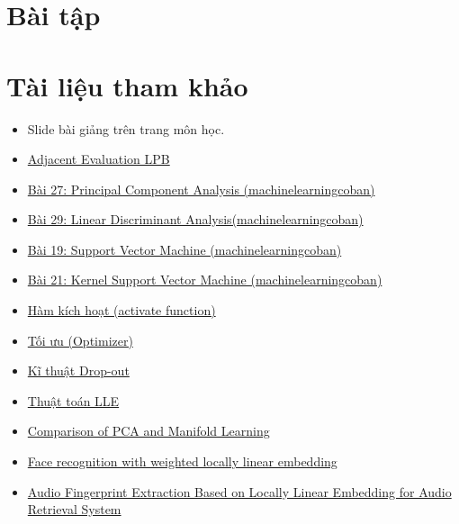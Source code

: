 \documentclass[a4paper, 12pt]{article}
\begin{document}
\section{Bài tập}



\pagebreak

\section{Tài liệu tham khảo}
\begin{itemize}
    \item Slide bài giảng trên trang môn học.
    \item \href{https://www.researchgate.net/publication/283539781_Adjacent_evaluation_of_local_binary_pattern_for_texture_classification}{Adjacent Evaluation LPB}
    \item \href{https://machinelearningcoban.com/2017/06/15/pca/}{Bài 27: Principal Component Analysis (machinelearningcoban)}
    \item \href{https://machinelearningcoban.com/2017/06/30/lda/}{Bài 29: Linear Discriminant Analysis(machinelearningcoban)}
    \item \href{https://machinelearningcoban.com/2017/04/09/smv/}{Bài 19: Support Vector Machine (machinelearningcoban)}
    \item \href{https://machinelearningcoban.com/2017/04/22/kernelsmv/}{Bài 21: Kernel Support Vector Machine (machinelearningcoban)}
    \item \href{https://aicurious.io/posts/2019-09-23-cac-ham-kich-hoat-activation-function-trong-neural-networks/}{Hàm kích hoạt (activate function)}
    \item \href{https://viblo.asia/p/optimizer-hieu-sau-ve-cac-thuat-toan-toi-uu-gdsgdadam-Qbq5QQ9E5D8}{Tối ưu (Optimizer)}
    \item \href{https://www.phamduytung.com/blog/2019-05-05-deep-learning-dropout/}{Kĩ thuật Drop-out}
    \item \href{https://qastack.vn/stats/82037/explain-steps-of-lle-local-linear-embedding-algorithm}{Thuật toán LLE}
    \item \href{https://www.astroml.org/book_figures/chapter7/fig_S_manifold_PCA.html}{Comparison of PCA and Manifold Learning}
    \item \href{https://ieeexplore.ieee.org/document/1443143}{Face recognition with weighted locally linear embedding}
    \item \href{https://www.researchgate.net/publication/344815452_Audio_Fingerprint_Extraction_Based_on_Locally_Linear_Embedding_for_Audio_Retrieval_System}{Audio Fingerprint Extraction Based on Locally Linear Embedding for Audio Retrieval System}

\end{itemize}
\end{document}
